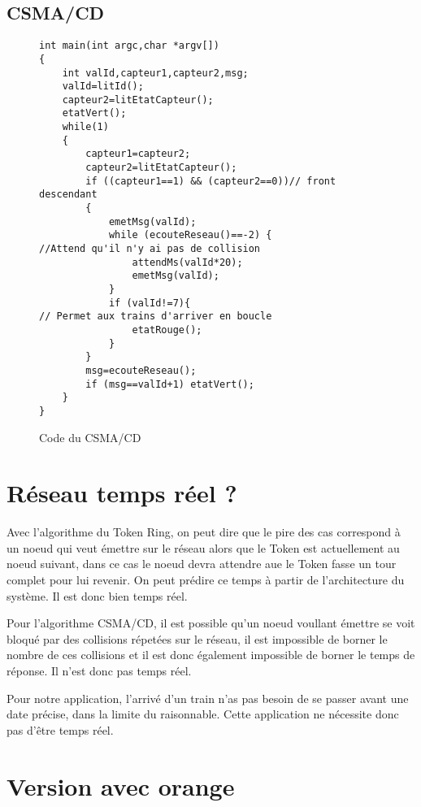 \documentclass[oneside,a4paper,11pt]{article}
\begin{document}
		\newpage
		
		\subsection{CSMA/CD}
		
		\begin{figure}[h]
		\centering
			\begin{lstlisting}
int main(int argc,char *argv[])
{
	int valId,capteur1,capteur2,msg;
	valId=litId();
	capteur2=litEtatCapteur();
	etatVert();
	while(1)
	{
		capteur1=capteur2;
		capteur2=litEtatCapteur();
		if ((capteur1==1) && (capteur2==0))// front descendant
		{
			emetMsg(valId);
			while (ecouteReseau()==-2) {
//Attend qu'il n'y ai pas de collision
				attendMs(valId*20);
				emetMsg(valId);
			}
			if (valId!=7){
// Permet aux trains d'arriver en boucle
				etatRouge();
			}
		}
		msg=ecouteReseau();
		if (msg==valId+1) etatVert();
	}
}
			\end{lstlisting}
			\caption{Code du CSMA/CD}
		\end{figure}		
	\newpage
	
	\section{Réseau temps réel ?}
	
	Avec l'algorithme du Token Ring, on peut dire que le pire des cas correspond à un noeud qui veut émettre sur le réseau alors que le Token est actuellement au noeud suivant, dans ce cas le noeud devra attendre aue le Token fasse un tour complet pour lui revenir. On peut prédire ce temps à partir de l'architecture du système. Il est donc bien temps réel.
	
	Pour l'algorithme CSMA/CD, il est possible qu'un noeud voullant émettre se voit bloqué par des collisions répetées sur le réseau, il est impossible de borner le nombre de ces collisions et il est donc également impossible de borner le temps de réponse. Il n'est donc pas temps réel.
	
	Pour notre application, l'arrivé d'un train n'as pas besoin de se passer avant une date précise, dans la limite du raisonnable. Cette application ne nécessite donc pas d'être temps réel.
	
	\newpage	
		
	\section{Version avec orange}
	
\end{document}
